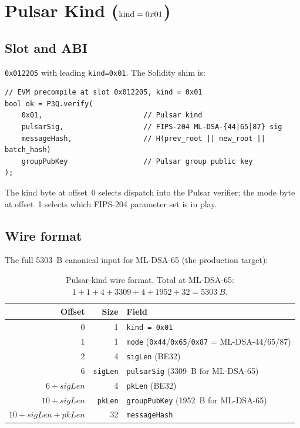 \section{Pulsar Kind ($\textnormal{kind} = 0x01$)}
\label{sec:pulsar-kind}

\subsection{Slot and ABI}

\texttt{0x012205} with leading \texttt{kind=0x01}. The Solidity
shim is:

\begin{lstlisting}[language={}]
// EVM precompile at slot 0x012205, kind = 0x01
bool ok = P3Q.verify(
    0x01,                        // Pulsar kind
    pulsarSig,                   // FIPS-204 ML-DSA-{44|65|87} sig
    messageHash,                 // H(prev_root || new_root || batch_hash)
    groupPubKey                  // Pulsar group public key
);
\end{lstlisting}

The kind byte at offset~0 selects dispatch into the Pulsar
verifier; the mode byte at offset~1 selects which FIPS-204
parameter set is in play.

\subsection{Wire format}

The full \SI{5303}{B} canonical input for ML-DSA-65 (the
production target):

\begin{table}[h]
\centering
\small
\begin{tabular}{@{}rrl@{}}
\toprule
\textbf{Offset} & \textbf{Size} & \textbf{Field} \\
\midrule
0 & 1 & \texttt{kind = 0x01} \\
1 & 1 & \texttt{mode} (\texttt{0x44}/\texttt{0x65}/\texttt{0x87} = ML-DSA-44/65/87) \\
2 & 4 & \texttt{sigLen} (BE32) \\
6 & \texttt{sigLen} & \texttt{pulsarSig} (\SI{3309}{B} for ML-DSA-65) \\
$6{+}\textit{sigLen}$ & 4 & \texttt{pkLen} (BE32) \\
$10{+}\textit{sigLen}$ & \texttt{pkLen} & \texttt{groupPubKey} (\SI{1952}{B} for ML-DSA-65) \\
$10{+}\textit{sigLen}{+}\textit{pkLen}$ & 32 & \texttt{messageHash} \\
\bottomrule
\end{tabular}
\caption{Pulsar-kind wire format. Total at ML-DSA-65:
$1+1+4+3309+4+1952+32 = \SI{5303}{B}$.}
\label{tab:pulsar-wire}
\end{table}

